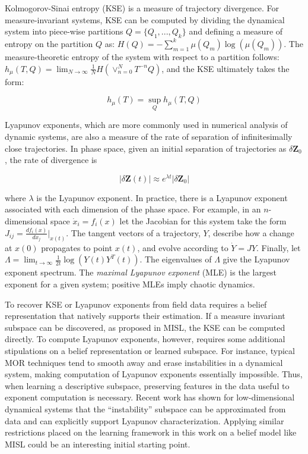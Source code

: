 Kolmogorov-Sinai entropy (KSE) is a measure of trajectory divergence.
For measure-invariant systems, KSE can be computed by dividing the dynamical system into piece-wise partitions $Q = \{Q_1,...,Q_k\}$ and defining a measure of entropy on the partition $Q$ as: $H(Q) = -\sum_{m=1}^k\mu(Q_m)\log(\mu(Q_m))$.
The measure-theoretic entropy of the system with respect to a partition follows: $h_\mu(T,Q) = \lim_{N\longrightarrow\infty} \frac{1}{N}H(\vee_{n=0}^N T^{-n}Q)$, and the KSE ultimately takes the form:

\begin{equation}
    h_\mu(T) = \sup_Q h_\mu(T,Q)
\end{equation}

Lyapunov exponents, which are more commonly used in numerical analysis of dynamic systems, are also a measure of the rate of separation of infinitesimally close trajectories.
In phase space, given an initial separation of trajectories as $\delta\mathbf{Z}_0$, the rate of divergence is

\begin{equation}
    |\delta\mathbf{Z}(t)| \approx e^{\lambda t}|\delta \mathbf{Z}_0|
\end{equation}

\noindent where $\lambda$ is the Lyapunov exponent. 
In practice, there is a Lyapunov exponent associated with each dimension of the phase space.
For example, in an $n$-dimensional space $\dot{x}_i = f_i(x)$ let the Jacobian for this system take the form $J_{ij} = \frac{df_i(x)}{dx_j}\Big|_{x(t)}$.
The tangent vectors of a trajectory, $Y$, describe how a change at $x(0)$ propagates to point $x(t)$, and evolve according to $\dot{Y} = JY$.
Finally, let $\Lambda = \lim_{t\longrightarrow \infty} \frac{1}{2t}\log(Y(t)Y^T(t))$.
The eigenvalues of $\Lambda$ give the Lyapunov exponent spectrum.
The \emph{maximal Lyapunov exponent} (MLE) is the largest exponent for a given system; positive MLEs imply chaotic dynamics.

To recover KSE or Lyapunov exponents from field data requires a belief representation that natively supports their estimation. If a measure invariant subspace can be discovered, as proposed in MISL, the KSE can be computed directly. To compute Lyapunov exponents, however, requires some additional stipulations on a belief representation or learned subspace. For instance, typical MOR techniques tend to smooth away and erase instabilities in a dynamical system, making computation of Lyapunov exponents essentially impossible. Thus, when learning a descriptive subspace, preserving features in the data useful to exponent computation is necessary. Recent work has shown for low-dimensional dynamical systems that the ``instability'' subspace can be approximated from data \autocite{blanchard2019learning,blanchard2019analytical} and can explicitly support Lyapunov characterization. Applying similar restrictions placed on the learning framework in this work on a belief model like MISL could be an interesting initial starting point.




